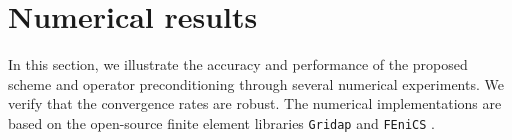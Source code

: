 \documentclass[11pt, reqno, a4paper, twoside]{article}
\newcommand*\tnorm[1]{|\!|\!| #1 |\!|\!|}
\newcommand\bzeta{\boldsymbol{\zeta}}
\newcommand{\rF}{\mathtt{F}}
\newcommand{\bW}{\mathbf{W}}
\newcommand\vdiv{\mathop{\mathrm{div}}\nolimits}
\numberwithin{equation}{section}
\numberwithin{remark}{section}
\numberwithin{figure}{section}
\numberwithin{table}{section}
\begin{document}

\section{Numerical results}\label{sec:numer}
In this section, we illustrate the accuracy and performance of the proposed scheme and operator preconditioning through several numerical experiments. We verify that the convergence rates are robust. The numerical implementations are based on the open-source  finite element libraries \texttt{Gridap} \cite{badia22} and \texttt{FEniCS} \cite{alnaes2015fenics}.
\end{document}
